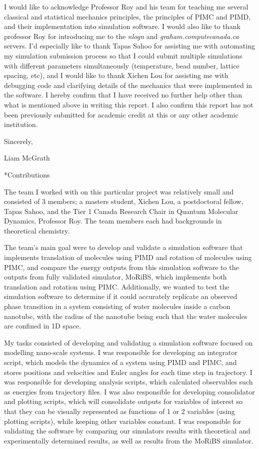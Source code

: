\documentclass[11pt]{article}
\makeatletter
\let\workreportsection\section
\renewcommand{\section}{\@ifstar{\workreportstarsection}{\workreportsection}}
\newcommand{\workreportstarsection}[1]{\workreportsection*{#1}\addcontentsline{toc}{section}{#1}}
\makeatother
\begin{document}
I would like to acknowledge Professor Roy and his team for teaching me several classical and statistical mechanics principles, the principles of PIMC and PIMD, and their implementation into simulation software. I would also like to thank professor Roy for introducing me to the \textit{nlogn} and \textit{graham.computecanada.ca} servers. I'd especially like to thank Tapas Sahoo for assisting me with automating my simulation submission process so that I could submit multiple simulations with different parameters simultaneously (temperature, bead number, lattice spacing, etc), and I would like to thank Xichen Lou for assisting me with debugging code and clarifying details of the mechanics that were implemented in the software. I hereby confirm that I have received no further help other than what is mentioned above in writing this report. I also confirm this report has not been previously submitted for academic credit at this or any other academic institution. 

Sincerely,
\vspace*{6\baselineskip}

Liam McGrath

\section*{Contributions}
\label{wr-front-contributions-1}


The team I worked with on this particular project was relatively small and consisted of 3 members; a masters student, Xichen Lou, a postdoctoral fellow, Tapas Sahoo, and the Tier 1 Canada Research Chair in Quantum Molecular Dynamics, Professor Roy. The team members each had backgrounds in theoretical chemistry. 

The team's main goal were to develop and validate a simulation software that implements translation of molecules using PIMD and rotation of molecules using PIMC, and compare the energy outputs from this simulation software to the outputs from fully validated simulator, MoRiBS, which implements both translation and rotation using PIMC. Additionally, we wanted to test the simulation software to determine if it could accurately replicate an observed phase transition in a system consisting of water molecules inside a carbon nanotube, with the radius of the nanotube being such that the water molecules are confined in 1D space. 

My tasks consisted of developing and validating a simulation software  focused on modelling nano-scale systems. I was responsible for developing an integrator script, which models the dynamics of a system using PIMD and PIMC, and stores positions and velocities and Euler angles for each time step in trajectory. I was responsible for developing analysis scripts, which calculated observables such as energies from trajectory files. I was also responsible for developing consolidator and plotting scripts, which will consolidate outputs for variables of interest so that they can be visually represented as functions of 1 or 2 variables (using plotting scripts), while keeping other variables constant. I was responsible for validating the software by comparing our simulators results with theoretical and experimentally determined results, as well as results from the MoRiBS simulator. 
\end{document}
